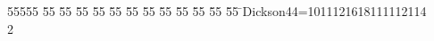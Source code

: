 %
%
\begin{tabbing}
55555 \= 55 \= 55 \= 55 \= 55 \= 55 \= 55 \= 55 \= 55 \= 55 \= 55 \= 55 \= 55 \= \>Dickson44=1011121618111112114\\[0pt]
2\>\end{tabbing}
